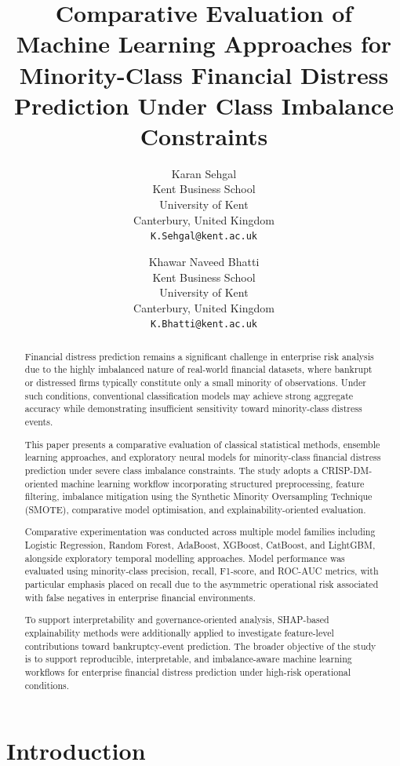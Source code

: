 \documentclass{article}
\title{
Comparative Evaluation of Machine Learning Approaches for Minority-Class Financial Distress Prediction Under Class Imbalance Constraints
}
\author{
Karan Sehgal \\
Kent Business School \\
University of Kent \\
Canterbury, United Kingdom \\
\texttt{K.Sehgal@kent.ac.uk}
\and
Khawar Naveed Bhatti \\
Kent Business School \\
University of Kent \\
Canterbury, United Kingdom \\
\texttt{K.Bhatti@kent.ac.uk}
}
\begin{document}
\maketitle

\begin{abstract}

Financial distress prediction remains a significant challenge in enterprise risk analysis due to the highly imbalanced nature of real-world financial datasets, where bankrupt or distressed firms typically constitute only a small minority of observations. Under such conditions, conventional classification models may achieve strong aggregate accuracy while demonstrating insufficient sensitivity toward minority-class distress events.

This paper presents a comparative evaluation of classical statistical methods, ensemble learning approaches, and exploratory neural models for minority-class financial distress prediction under severe class imbalance constraints. The study adopts a CRISP-DM-oriented machine learning workflow incorporating structured preprocessing, feature filtering, imbalance mitigation using the Synthetic Minority Oversampling Technique (SMOTE), comparative model optimisation, and explainability-oriented evaluation.

Comparative experimentation was conducted across multiple model families including Logistic Regression, Random Forest, AdaBoost, XGBoost, CatBoost, and LightGBM, alongside exploratory temporal modelling approaches. Model performance was evaluated using minority-class precision, recall, F1-score, and ROC-AUC metrics, with particular emphasis placed on recall due to the asymmetric operational risk associated with false negatives in enterprise financial environments.

To support interpretability and governance-oriented analysis, SHAP-based explainability methods were additionally applied to investigate feature-level contributions toward bankruptcy-event prediction. The broader objective of the study is to support reproducible, interpretable, and imbalance-aware machine learning workflows for enterprise financial distress prediction under high-risk operational conditions.

\end{abstract}

\section{Introduction}
\end{document}

